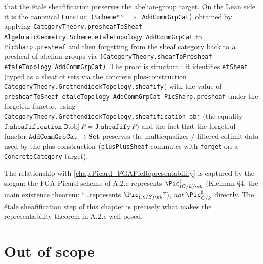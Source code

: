 \begin{itemize}
    that the \'etale sheafification preserves the abelian-group target.
    On the Lean side it is the canonical
    \texttt{Functor (Schemeᵒᵖ \(\Rightarrow\) AddCommGrpCat)}
    obtained by applying
    \texttt{CategoryTheory.presheafToSheaf
    AlgebraicGeometry.Scheme.etaleTopology AddCommGrpCat} to
    \texttt{PicSharp.presheaf} and then forgetting from the sheaf
    category back to a presheaf-of-abelian-groups via
    \texttt{(CategoryTheory.sheafToPresheaf etaleTopology
    AddCommGrpCat)}. The proof is structural: it identifies
    \texttt{etSheaf} (typed as a sheaf of sets via the concrete
    plus-construction
    \texttt{CategoryTheory.GrothendieckTopology.sheafify}) with the
    value of \texttt{presheafToSheaf etaleTopology AddCommGrpCat
    PicSharp.presheaf} under the forgetful functor, using
    \texttt{CategoryTheory.GrothendieckTopology.sheafification\_obj}
    (the equality \(\texttt{J.sheafification D}.\mathrm{obj}\, P =
    \texttt{J.sheafify}\, P\)) and the fact that the forgetful functor
    \(\texttt{AddCommGrpCat} \to \mathbf{Set}\) preserves the
    multiequalizer / filtered-colimit data used by the
    plus-construction (\texttt{plusPlusSheaf} commutes with
    \texttt{forget} on a \texttt{ConcreteCategory} target).
\end{itemize}

The relationship with \cref{chap:Picard_FGAPicRepresentability} is captured by
the slogan: the FGA Picard scheme of A.2.c represents
\(\Pic^\sharp_{(C/k)\et}\) (Kleiman \S 4, the main existence theorem: ``\dots represents
\(\Pic_{(X/S)\et}\)''), \emph{not} \(\Pic^\sharp_{C/k}\) directly. The \'etale
sheafification step of this chapter is precisely what makes the
representability theorem in A.2.c well-posed.

\section{Out of scope}
\label{sec:relpic_out_of_scope}

